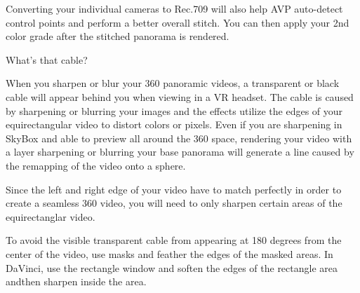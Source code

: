 \begin{fullwidth}
Converting your individual cameras to Rec.709 will also help AVP auto-detect control points and perform a better overall stitch. You can then apply your 2nd color grade after the stitched panorama is rendered.

{\large What's that cable? \par}

When you sharpen or blur your 360 panoramic videos, a transparent or black cable will appear behind you when viewing in a VR headset. The cable is caused by sharpening or blurring your images and the effects utilize the edges of your equirectangular video to distort colors or pixels. Even if you are sharpening in SkyBox and able to preview all around the 360 space, rendering your video with a layer sharpening or blurring your base panorama will generate a line caused by the remapping of the video onto a sphere.


Since the left and right edge of your video have to match perfectly in order to create a seamless 360 video, you will need to only sharpen certain areas of the equirectanglar video.

To avoid the visible transparent cable from appearing at 180 degrees from the center of the video, use masks and feather the edges of the masked areas. In DaVinci, use the rectangle window and soften the edges of the rectangle area andthen sharpen inside the area.



\end{fullwidth}